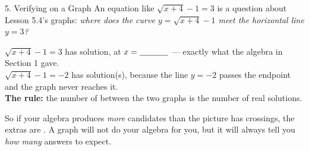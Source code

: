 \documentclass[10pt]{article}
\newcommand{\lgrid}[4]{%
  \draw[step=1, linegray!40, very thin] (#1,#3) grid (#2,#4);
  \draw[->, semithick, charcoal] (#1,0)--(#2,0) node[below right, font=\scriptsize]{$x$};
  \draw[->, semithick, charcoal] (0,#3)--(0,#4) node[left, font=\scriptsize]{$y$};}
\begin{document}
\begin{notesbox}{5. Verifying on a Graph}
An equation like $\sqrt{x+4}-1=3$ is a question about Lesson 5.4's graphs: \emph{where does the
curve $y=\sqrt{x+4}-1$ meet the horizontal line $y=3$?}
\begin{center}
\begin{minipage}[c]{0.52\linewidth}
\centering
{}
\end{minipage}
\begin{minipage}[c]{0.44\linewidth}
\small
$\sqrt{x+4}-1=3$ has \blank{1.2cm} solution, at $x=\blank{1.2cm}$ --- exactly what the algebra in
Section 1 gave. \\[6pt]
$\sqrt{x+4}-1=-2$ has \blank{1.2cm} solution(s), because the line $y=-2$ passes
\blank{2.4cm} the endpoint and the graph never reaches it. \\[6pt]
\textbf{The rule:} the number of \blank{2.6cm} between the two graphs is the number of real
solutions.
\end{minipage}
\end{center}
\vspace{2pt}
So if your algebra produces \emph{more} candidates than the picture has crossings, the extras are
\blank{2.6cm}. A graph will not do your algebra for you, but it will always tell you \emph{how
many} answers to expect.
\end{notesbox}
\end{document}
